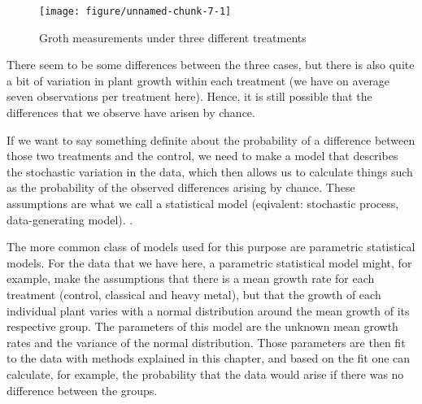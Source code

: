 \documentclass[a4paper,twoside]{tufte-book}\usepackage[]{graphicx}\usepackage[]{color}
\makeatletter
\def\maxwidth{ %
  \ifdim\Gin@nat@width>\linewidth
    \linewidth
  \else
    \Gin@nat@width
  \fi
}
\makeatother
\begin{document}
{\begin{figure}[htbp]
\begin{center}
\begin{Schunk}

\texttt{[image: figure/unnamed-chunk-7-1]} \end{Schunk}
\caption{Groth measurements under three different treatments}
\label{fig: plant growth music}
\end{center}
\end{figure}

There seem to be some differences between the three cases, but there is also quite a bit of variation in plant growth within each treatment (we have on average seven observations per treatment here). Hence, it is still possible that the differences that we observe have arisen by chance. 

If we want to say something definite about the probability of a difference between those two treatments and the control, we need to make a model that describes the stochastic variation in the data, which then allows us to calculate things such as the probability of the observed differences arising by chance. These assumptions are what we call a statistical model (eqivalent: stochastic process, data-generating model). . 

The more common class of models used for this purpose are parametric statistical models. For the data that we have here, a parametric statistical model might, for example, make the assumptions that there is a mean growth rate for each treatment (control, classical and heavy metal), but that the growth of each individual plant varies with a normal distribution around the mean growth of its respective group. The parameters of this model are the unknown mean growth rates and the variance of the normal distribution. Those parameters are then fit to the data with methods explained in this chapter, and based on the fit one can calculate, for example, the probability that the data would arise if there was no difference between the groups.

}
\end{document}

